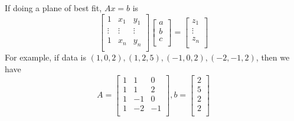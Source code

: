 \documentclass{article}
\begin{document}
    \begin{example}
      If doing a plane of best fit, $Ax = b$ is \[
        \begin{bmatrix}
          1 & x_1 & y_1\\
          \vdots & \vdots & \vdots\\
          1 & x_n & y_n\\
        \end{bmatrix}
        \begin{bmatrix}
          a\\b\\c\\
        \end{bmatrix} =
        \begin{bmatrix}
          z_1\\\vdots\\z_n\\
        \end{bmatrix}
      \]
      For example, if data is $(1, 0, 2), (1, 2, 5), (-1, 0, 2), (-2, -1, 2)$, then we have \[
        A=
        \begin{bmatrix}
          1 & 1 & 0\\
          1 & 1 & 2\\
          1 & -1 & 0\\
          1 & -2 & -1\\
        \end{bmatrix}, b =
        \begin{bmatrix}
          2\\5\\2\\2\\
        \end{bmatrix}
      \]
    \end{example}
    
\end{document}

